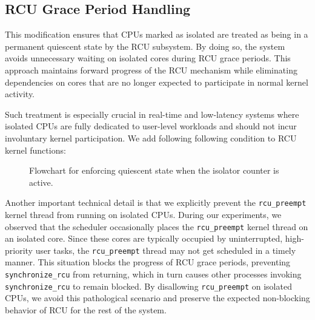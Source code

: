 \documentclass[letterpaper]{article}
\begin{document}
\subsection{RCU Grace Period Handling}
This modification ensures that CPUs marked as isolated are treated as being in a permanent
quiescent state by the RCU subsystem. By doing so, the system avoids unnecessary waiting on
isolated cores during RCU grace periods. This approach maintains forward progress of the RCU
mechanism while eliminating dependencies on cores that are no longer expected to participate in
normal kernel activity.

Such treatment is especially crucial in real-time and low-latency systems where isolated CPUs are
fully dedicated to user-level workloads and should not incur involuntary kernel participation.
We add following following condition to RCU kernel functions:


\begin{figure}[t]
\centering
{}
\caption{Flowchart for enforcing quiescent state when the isolator counter is active.}
\label{fig:quiescent}
\end{figure}



Another important technical detail is that we explicitly prevent the \texttt{rcu\_preempt} kernel 
thread from running on isolated CPUs. During our experiments, we observed that the scheduler 
occasionally places the \texttt{rcu\_preempt} kernel thread on an isolated core. Since these cores 
are typically occupied by uninterrupted, high-priority user tasks, the \texttt{rcu\_preempt} 
thread may not get scheduled in a timely manner. This situation blocks the progress of RCU grace 
periods, preventing \texttt{synchronize\_rcu} from returning, which in turn causes other processes 
invoking \texttt{synchronize\_rcu} to remain blocked. By disallowing \texttt{rcu\_preempt} on 
isolated CPUs, we avoid this pathological scenario and preserve the expected non-blocking behavior 
of RCU for the rest of the system.  
\end{document}
